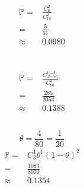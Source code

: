 \documentclass{article}
\begin{document}
        \subsection{}
            \paragraph{
                \begin{equation*}
                    \begin{split}
                        \mathbb{P}=&\frac{C_{6}^2}{C_{18}^2}\\
                            =&\frac{5}{51}\\
                            \approx&0.0980
                    \end{split}
                \end{equation*}
            }

    \section{}
        \subsection{}
            \paragraph{
                \begin{equation*}
                    \begin{split}
                        \mathbb{P}=&\frac{C_4^1C_{76}^2}{C_{80}^3}\\
                            =&\frac{285}{2054}\\
                            \approx&0.1388
                    \end{split}
                \end{equation*}
            }
        \subsection{}
            \paragraph{
                $$\theta=\frac{4}{80}=\frac{1}{20}$$ 
                \begin{equation*}
                    \begin{split}
                        \mathbb{P}=&C_3^1\theta^1(1-\theta)^2\\
                            =&\frac{1083}{8000}\\
                            \approx&0.1354
                    \end{split}
                \end{equation*}  
            }
\end{document}
